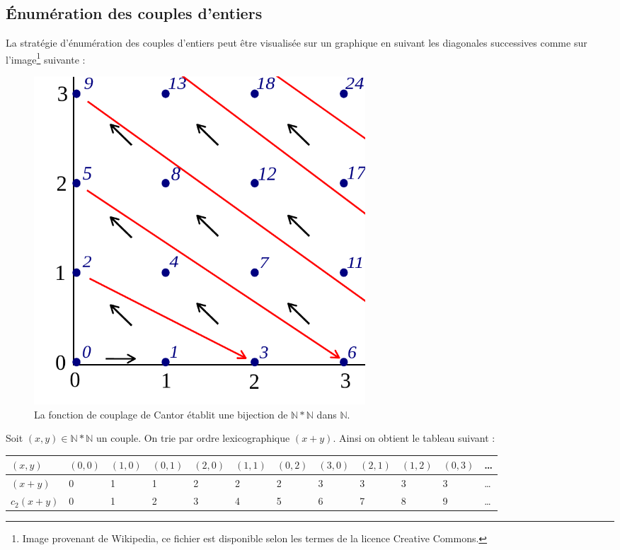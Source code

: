 \subsection{Énumération des couples d'entiers}
La stratégie d'énumération des couples d'entiers peut être visualisée sur un graphique en suivant les diagonales successives comme sur l'image\footnote{Image provenant de Wikipedia, ce fichier est disponible selon les termes de la licence
 Creative Commons.} suivante :
\begin{figure}[!h]
\begin{center}
\includegraphics[width=0.6\textwidth]{files/diagcouples.pdf}
\caption{La fonction de couplage de Cantor établit une bijection de $\mathbb{N}*\mathbb{N}$ dans
 $\mathbb{N}$.}
 \end{center}
\end{figure}

Soit $(x,y) \in \mathbb{N}*\mathbb{N}$ un couple. On trie par ordre lexicographique $(x+y)$. Ainsi on obtient le tableau suivant :

\begin{tabularx}{1.1\textwidth}{| m{1.5cm} | X | X | X | X | X | X | X | X | X | X | X }
\hline
$(x,y)$ & $(0,0)$ & $(1,0)$ & $(0,1)$ & $(2,0)$ & $(1,1)$ & $(0,2)$ & $(3,0)$ & $(2,1)$ & $(1,2)$ & $(0,3)$ & \ldots \\
\hline
$(x+y)$ & 0 & 1 & 1 & 2 & 2 & 2 & 3 & 3 & 3 & 3 & \ldots \\
\hline
$c_2(x+y)$ & 0 & 1 & 2 & 3 & 4 & 5 & 6 & 7 & 8 & 9 & \ldots \\
\hline
\end{tabularx}

